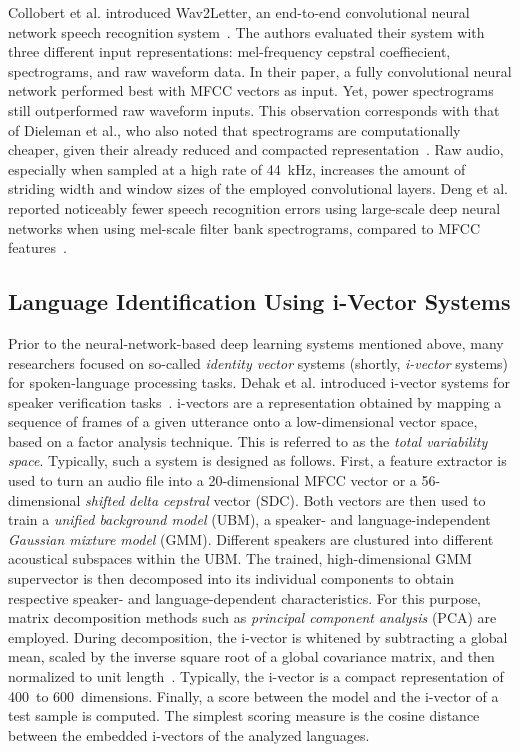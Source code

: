 Collobert et al. introduced Wav2Letter, an end-to-end convolutional neural network speech recognition system~\cite{collobert2016wav2letter}. The authors evaluated their system with three different input representations: mel-frequency cepstral coeffiecient, spectrograms, and raw waveform data. In their paper, a fully convolutional neural network performed best with MFCC vectors as input. Yet, power spectrograms still outperformed raw waveform inputs. This observation corresponds with that of Dieleman et al., who also noted that spectrograms are computationally cheaper, given their already reduced and compacted representation~\cite{dieleman2014end}. Raw audio, especially when sampled at a high rate of \SI{44}{\kilo\hertz}, increases the amount of striding width and window sizes of the employed convolutional layers.
Deng et al. reported noticeably fewer speech recognition errors using large-scale deep neural networks when using mel-scale filter bank spectrograms, compared to MFCC features~\cite{deng2013recent}.

\subsection{Language Identification Using i-Vector Systems}
\label{sec:i-vector-systems}
Prior to the neural-network-based deep learning systems mentioned above, many researchers focused on so-called \emph{identity vector} systems (shortly, \emph{i-vector} systems) for spoken-language processing tasks. Dehak et al. introduced i-vector systems for speaker verification tasks~\cite{dehak2011front}. i-vectors are a representation obtained by mapping a sequence of frames of a given utterance onto a low-dimensional vector space, based on a factor analysis technique. This is referred to as the \emph{total variability space}. Typically, such a system is designed as follows. First, a feature extractor is used to turn an audio file into a \num{20}-dimensional MFCC vector or a \num{56}-dimensional \emph{shifted delta cepstral} vector (SDC). Both vectors are then used to train a \emph{unified background model} (UBM), a speaker- and language-independent \emph{Gaussian mixture model} (GMM). Different speakers are clustured into different acoustical subspaces within the UBM. The trained, high-dimensional GMM supervector is then decomposed into its individual components to obtain respective speaker- and language-dependent characteristics. For this purpose, matrix decomposition methods such as \emph{principal component analysis} (PCA) are employed. During decomposition, the i-vector is whitened by subtracting a global mean, scaled by the inverse square root of a global covariance matrix, and then normalized to unit length~\cite{garcia2011analysis}. Typically, the i-vector is a compact representation of \num{400}~to \num{600}~dimensions. Finally, a score between the model and the i-vector of a test sample is computed. The simplest scoring measure is the cosine distance between the embedded i-vectors of the analyzed languages.


